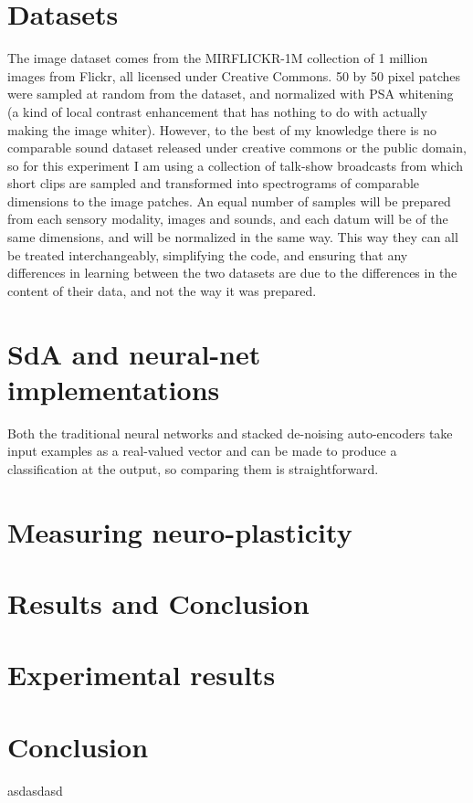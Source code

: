 \documentclass[12pt]{article}
\begin{document}
	\section{Datasets}
	The image dataset comes from the MIRFLICKR-1M collection of 1 million images from Flickr, all licensed under Creative Commons. 50 by 50 pixel patches were sampled at random from the dataset, and normalized with PSA whitening (a kind of local contrast enhancement that has nothing to do with actually making the image whiter).
	However, to the best of my knowledge there is no comparable sound dataset released under creative commons or the public domain, so for this experiment I am using a collection of talk-show broadcasts from which short clips are sampled and transformed into spectrograms of comparable dimensions to the image patches.
	An equal number of samples will be prepared from each sensory modality, images and sounds, and each datum will be of the same dimensions, and will be normalized in the same way. This way they can all be treated interchangeably, simplifying the code, and ensuring that any differences in learning between the two datasets are due to the differences in the content of their data, and not the way it was prepared. 
	
	\section{SdA and neural-net implementations}
	Both the traditional neural networks and stacked de-noising auto-encoders take input examples as a real-valued vector and can be made to produce a classification at the output, so comparing them is straightforward. 
	
	\section{Measuring neuro-plasticity}
	
	
\section{Results and Conclusion}
	\section{Experimental results}
	\section{Conclusion}


\begin{thebibliography}{99}
\singlespacing

 asdasdasd

\end{thebibliography}
\end{document}
